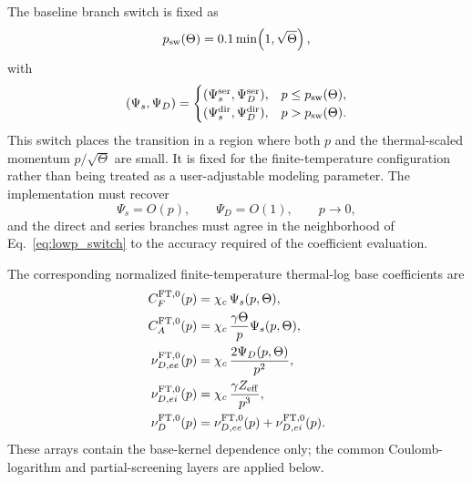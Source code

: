 \documentclass[11pt]{article}
\begin{document}
The baseline branch switch is fixed as
\begin{equation}
 p_{\rm sw}(\Theta)=0.1\min\!\left(1,\sqrt{\Theta}\right),
 \label{eq:lowp_switch}
\end{equation}
with
\begin{equation}
 (\Psi_s,\Psi_D)=
 \begin{cases}
  (\Psi_s^{\rm ser},\Psi_D^{\rm ser}), & p\le p_{\rm sw}(\Theta),\\
  (\Psi_s^{\rm dir},\Psi_D^{\rm dir}), & p>p_{\rm sw}(\Theta).
 \end{cases}
 \label{eq:collision_function_branch}
\end{equation}
This switch places the transition in a region where both $p$ and the thermal-scaled
momentum $p/\sqrt{\Theta}$ are small.  It is fixed for the finite-temperature configuration rather than
being treated as a user-adjustable modeling parameter.  The implementation must recover
\begin{equation}
 \Psi_s=O(p),\qquad \Psi_D=O(1),\qquad p\rightarrow0,
 \label{eq:low_p_limits}
\end{equation}
and the direct and series branches must agree in the neighborhood of
Eq.~\eqref{eq:lowp_switch} to the accuracy required of the coefficient evaluation.

The corresponding normalized finite-temperature thermal-log base coefficients are
\begin{align}
 C_F^{\rm FT,0}(p)
 &=\chi_c\,\Psi_s(p,\Theta),
 \label{eq:ft_numeric_cf_base}\\
 C_A^{\rm FT,0}(p)
 &=\chi_c\,\frac{\gamma\Theta}{p}\Psi_s(p,\Theta),
 \label{eq:ft_numeric_ca_base}\\
 \nu_{D,ee}^{\rm FT,0}(p)
 &=\chi_c\,\frac{2\Psi_D(p,\Theta)}{p^2},\\
 \nu_{D,ei}^{\rm FT,0}(p)
 &=\chi_c\,\frac{\gamma Z_{\rm eff}}{p^3},\\
 \nu_D^{\rm FT,0}(p)
 &=\nu_{D,ee}^{\rm FT,0}(p)+\nu_{D,ei}^{\rm FT,0}(p).
 \label{eq:ft_numeric_nud_base}
\end{align}
These arrays contain the base-kernel dependence only; the common Coulomb-logarithm and
partial-screening layers are applied below.
\end{document}
